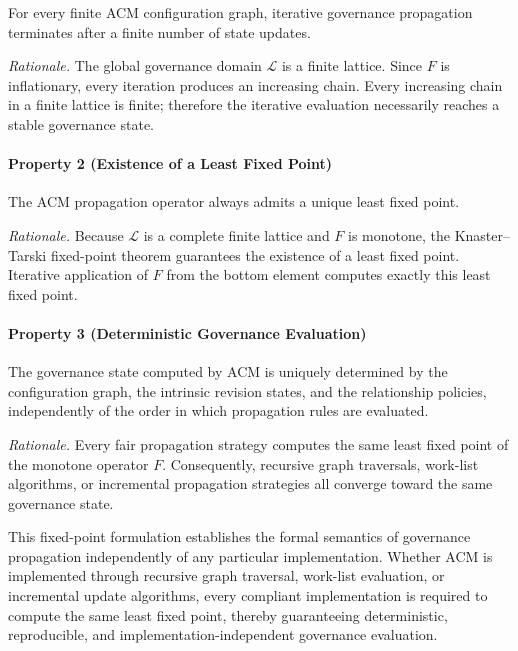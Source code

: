 \documentclass[10pt]{article}
\begin{document}
For every finite ACM configuration graph, iterative governance propagation
terminates after a finite number of state updates.

\emph{Rationale.}
The global governance domain $\mathcal{L}$ is a finite lattice.
Since $F$ is inflationary, every iteration produces an increasing chain.
Every increasing chain in a finite lattice is finite; therefore the iterative
evaluation necessarily reaches a stable governance state.


\paragraph{Property 2 (Existence of a Least Fixed Point)}

The ACM propagation operator always admits a unique least fixed point.

\emph{Rationale.}
Because $\mathcal{L}$ is a complete finite lattice and $F$ is monotone, the
Knaster--Tarski fixed-point theorem guarantees the existence of a least fixed
point. Iterative application of $F$ from the bottom element computes exactly
this least fixed point.


\paragraph{Property 3 (Deterministic Governance Evaluation)}

The governance state computed by ACM is uniquely determined by the
configuration graph, the intrinsic revision states, and the relationship
policies, independently of the order in which propagation rules are evaluated.

\emph{Rationale.}
Every fair propagation strategy computes the same least fixed point of the
monotone operator $F$. Consequently, recursive graph traversals, work-list
algorithms, or incremental propagation strategies all converge toward the same
governance state.


This fixed-point formulation establishes the formal semantics of governance
propagation independently of any particular implementation. Whether ACM is
implemented through recursive graph traversal, work-list evaluation, or
incremental update algorithms, every compliant implementation is required to
compute the same least fixed point, thereby guaranteeing deterministic,
reproducible, and implementation-independent governance evaluation.
\end{document}
